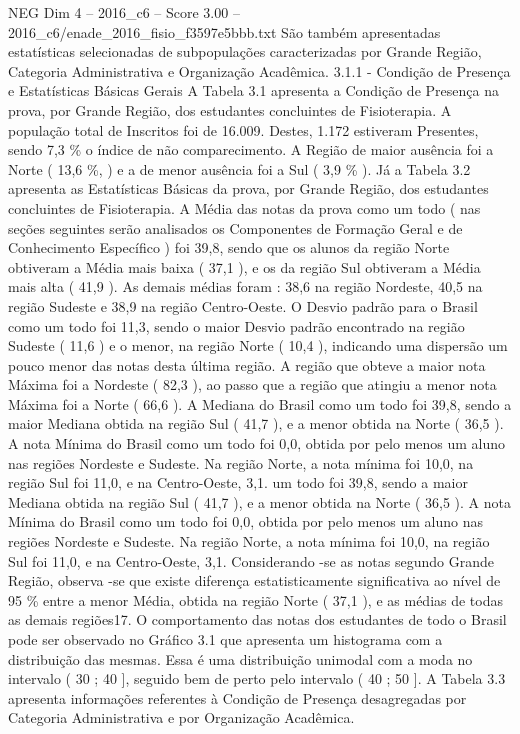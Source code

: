 \begin{textsample}{NEG Dim 4 – 2016\_c6 – Score 3.00 – 2016\_c6/enade\_2016\_fisio\_f3597e5bbb.txt}
São também apresentadas estatísticas selecionadas de subpopulações caracterizadas por Grande Região, Categoria Administrativa e Organização Acadêmica. 3.1.1 - Condição de Presença e Estatísticas Básicas Gerais A Tabela 3.1 apresenta a Condição de Presença na prova, por Grande Região, dos estudantes concluintes de Fisioterapia.
A população total de Inscritos foi de 16.009.
Destes, 1.172 estiveram Presentes, sendo 7,3 \% o índice de não comparecimento.
A Região de maior ausência foi a Norte ( 13,6 \%, ) e a de menor ausência foi a Sul ( 3,9 \% ).
Já a Tabela 3.2 apresenta as Estatísticas Básicas da prova, por Grande Região, dos estudantes concluintes de Fisioterapia.
A Média das notas da prova como um todo ( nas seções seguintes serão analisados os Componentes de Formação Geral e de Conhecimento Específico ) foi 39,8, sendo que os alunos da região Norte obtiveram a Média mais baixa ( 37,1 ), e os da região Sul obtiveram a Média mais alta ( 41,9 ).
As demais médias foram : 38,6 na região Nordeste, 40,5 na região Sudeste e 38,9 na região Centro-Oeste.
O Desvio padrão para o Brasil como um todo foi 11,3, sendo o maior Desvio padrão encontrado na região Sudeste ( 11,6 ) e o menor, na região Norte ( 10,4 ), indicando uma dispersão um pouco menor das notas desta última região.
A região que obteve a maior nota Máxima foi a Nordeste ( 82,3 ), ao passo que a região que atingiu a menor nota Máxima foi a Norte ( 66,6 ).
A Mediana do Brasil como um todo foi 39,8, sendo a maior Mediana obtida na região Sul ( 41,7 ), e a menor obtida na Norte ( 36,5 ).
A nota Mínima do Brasil como um todo foi 0,0, obtida por pelo menos um aluno nas regiões Nordeste e Sudeste.
Na região Norte, a nota mínima foi 10,0, na região Sul foi 11,0, e na Centro-Oeste, 3,1. um todo foi 39,8, sendo a maior Mediana obtida na região Sul ( 41,7 ), e a menor obtida na Norte ( 36,5 ).
A nota Mínima do Brasil como um todo foi 0,0, obtida por pelo menos um aluno nas regiões Nordeste e Sudeste.
Na região Norte, a nota mínima foi 10,0, na região Sul foi 11,0, e na Centro-Oeste, 3,1.
Considerando -se as notas segundo Grande Região, observa -se que existe diferença estatisticamente significativa ao nível de 95 \% entre a menor Média, obtida na região Norte ( 37,1 ), e as médias de todas as demais regiões17.
O comportamento das notas dos estudantes de todo o Brasil pode ser observado no Gráfico 3.1 que apresenta um histograma com a distribuição das mesmas.
Essa é uma distribuição unimodal com a moda no intervalo ( 30 ; 40 ], seguido bem de perto pelo intervalo ( 40 ; 50 ].
A Tabela 3.3 apresenta informações referentes à Condição de Presença desagregadas por Categoria Administrativa e por Organização Acadêmica.

\end{textsample}
